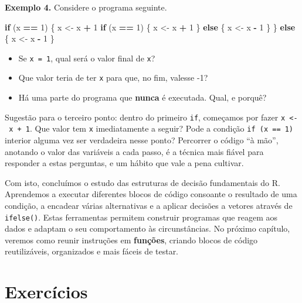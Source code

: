 \documentclass[
  portuguese,
  11pt,
  openany]{book}
\newenvironment{Shaded}{\begin{snugshade}}{\end{snugshade}}
\newcommand{\ControlFlowTok}[1]{\textcolor[rgb]{0.13,0.29,0.53}{\textbf{#1}}}
\newcommand{\DecValTok}[1]{\textcolor[rgb]{0.00,0.00,0.81}{#1}}
\newcommand{\NormalTok}[1]{#1}
\newcommand{\OtherTok}[1]{\textcolor[rgb]{0.56,0.35,0.01}{#1}}
\newcommand{\SpecialCharTok}[1]{\textcolor[rgb]{0.81,0.36,0.00}{\textbf{#1}}}
\providecommand{\tightlist}{%
  \setlength{\itemsep}{0pt}\setlength{\parskip}{0pt}}
\begin{document}
\textbf{Exemplo 4.} Considere o programa seguinte.

\begin{Shaded}
\begin{Highlighting}[]
\ControlFlowTok{if}\NormalTok{ (x }\SpecialCharTok{==} \DecValTok{1}\NormalTok{) \{}
\NormalTok{  x }\OtherTok{\textless{}{-}}\NormalTok{ x }\SpecialCharTok{+} \DecValTok{1}
  \ControlFlowTok{if}\NormalTok{ (x }\SpecialCharTok{==} \DecValTok{1}\NormalTok{) \{}
\NormalTok{    x }\OtherTok{\textless{}{-}}\NormalTok{ x }\SpecialCharTok{+} \DecValTok{1}
\NormalTok{  \} }\ControlFlowTok{else}\NormalTok{ \{}
\NormalTok{    x }\OtherTok{\textless{}{-}}\NormalTok{ x }\SpecialCharTok{{-}} \DecValTok{1}
\NormalTok{  \}}
\NormalTok{\} }\ControlFlowTok{else}\NormalTok{ \{}
\NormalTok{  x }\OtherTok{\textless{}{-}}\NormalTok{ x }\SpecialCharTok{{-}} \DecValTok{1}
\NormalTok{\}}
\end{Highlighting}
\end{Shaded}

\begin{itemize}
\tightlist
\item
  Se \texttt{x\ =\ 1}, qual será o valor final de \texttt{x}?
\item
  Que valor teria de ter \texttt{x} para que, no fim, valesse -1?
\item
  Há uma parte do programa que \textbf{nunca} é executada. Qual, e porquê?
\end{itemize}

Sugestão para o terceiro ponto: dentro do primeiro \texttt{if}, começamos por fazer
\texttt{x\ \textless{}-\ x\ +\ 1}. Que valor tem \texttt{x} imediatamente a seguir? Pode a condição
\texttt{if\ (x\ ==\ 1)} interior alguma vez ser verdadeira nesse ponto? Percorrer o código
``à mão'', anotando o valor das variáveis a cada passo, é a técnica mais fiável para
responder a estas perguntas, e um hábito que vale a pena cultivar.

Com isto, concluímos o estudo das estruturas de decisão fundamentais do R. Aprendemos a executar diferentes blocos de código consoante o resultado de uma condição, a encadear várias alternativas e a aplicar decisões a vetores através de \texttt{ifelse()}. Estas ferramentas permitem construir programas que reagem aos dados e adaptam o seu comportamento às circunstâncias. No próximo capítulo, veremos como reunir instruções em \textbf{funções}, criando blocos de código reutilizáveis, organizados e mais fáceis de testar.

\section{Exercícios}\label{exercuxedcios-6}
\end{document}
